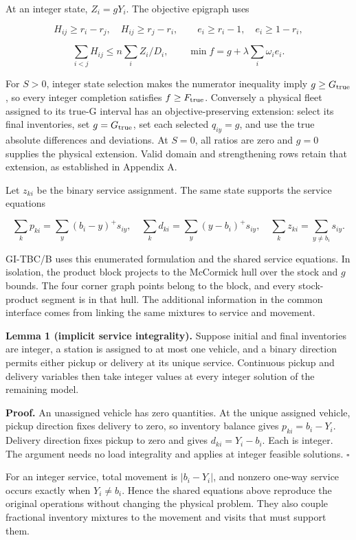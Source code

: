 \documentclass[
  american,
  11pt,
]{article}
\begin{document}
At an integer state, \(Z_i=gY_i\). The objective epigraph uses

\[
H_{ij}\ge r_i-r_j,\quad H_{ij}\ge r_j-r_i,\qquad
e_i\ge r_i-1,\quad e_i\ge1-r_i,
\]

\[
\sum_{i<j}H_{ij}\le n\sum_i Z_i/D_i,\qquad
\min f=g+\lambda\sum_i\omega_i e_i.
\]

For \(S>0\), integer state selection makes the numerator inequality
imply \(g\ge G_{\rm true}\), so every integer completion satisfies
\(f\ge F_{\rm true}\). Conversely a physical fleet assigned to its
true-G interval has an objective-preserving extension: select its final
inventories, set \(g=G_{\rm true}\), set each selected \(q_{iy}=g\), and
use the true absolute differences and deviations. At \(S=0\), all ratios
are zero and \(g=0\) supplies the physical extension. Valid domain and
strengthening rows retain that extension, as established in Appendix A.

Let \(z_{ki}\) be the binary service assignment. The same state supports
the service equations

\[
\sum_kp_{ki}=\sum_y(b_i-y)^+s_{iy},\quad
\sum_kd_{ki}=\sum_y(y-b_i)^+s_{iy},\quad
\sum_kz_{ki}=\sum_{y\ne b_i}s_{iy}.
\]

GI-TBC/B uses this enumerated formulation and the shared service
equations. In isolation, the product block projects to the McCormick
hull over the stock and \(g\) bounds. The four corner graph points
belong to the block, and every stock-product segment is in that hull.
The additional information in the common interface comes from linking
the same mixtures to service and movement.


\textbf{Lemma 1 (implicit service integrality).} Suppose initial and
final inventories are integer, a station is assigned to at most one
vehicle, and a binary direction permits either pickup or delivery at its
unique service. Continuous pickup and delivery variables then take
integer values at every integer solution of the remaining model.

\textbf{Proof.} An unassigned vehicle has zero quantities. At the unique
assigned vehicle, pickup direction fixes delivery to zero, so inventory
balance gives \(p_{ki}=b_i-Y_i\). Delivery direction fixes pickup to
zero and gives \(d_{ki}=Y_i-b_i\). Each is integer. The argument needs
no load integrality and applies at integer feasible solutions.
\(\square\)

For an integer service, total movement is \(|b_i-Y_i|\), and nonzero
one-way service occurs exactly when \(Y_i\ne b_i\). Hence the shared
equations above reproduce the original operations without changing the
physical problem. They also couple fractional inventory mixtures to the
movement and visits that must support them.
\end{document}
